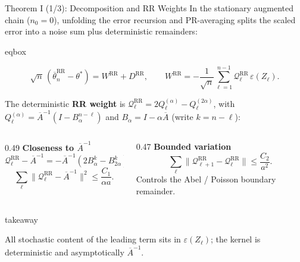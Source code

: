 \documentclass[11pt,aspectratio=169,xcolor=table]{beamer}
\newcommand{\colhead}[1]{\textcolor{ThesisBlue}{\bfseries #1}}
\newcommand{\RR}{\mathrm{RR}}
\newcommand{\Abar}{\overline{A}}
\newcommand{\eps}{\varepsilon}
\newenvironment{eqbox}
  {\begin{beamercolorbox}[wd=\linewidth,sep=0.48em,center,rounded=true]{eqbox}%
   \begin{minipage}{0.97\linewidth}\centering}
  {\end{minipage}\end{beamercolorbox}}
\newenvironment{takeawaybox}
  {\begin{beamercolorbox}[wd=\linewidth,sep=0.52em,leftskip=0.25em,rightskip=0.25em,rounded=true]{takeaway}%
   \begin{minipage}{0.96\linewidth}%
   \llap{{\color{ThesisGreen}\rule{2.5pt}{2.6ex}}\hspace{0.5em}}}
  {\end{minipage}\end{beamercolorbox}}
\begin{document}
\begin{frame}[shrink=10]{Theorem I (1/3): Decomposition and RR Weights}
\footnotesize
In the stationary augmented chain ($n_0=0$), unfolding the error recursion and
PR-averaging splits the scaled error into a noise sum plus deterministic
remainders:

\begin{eqbox}
\[
  \sqrt n\,(\overline\theta_n^\RR-\theta^*)=W^\RR+D^\RR,
  \qquad
  W^\RR=-\frac1{\sqrt n}\sum_{\ell=1}^{n-1}
    \mathcal Q_\ell^\RR\,\eps(Z_\ell).
\]
\end{eqbox}

The deterministic \textbf{RR weight} is
$\mathcal Q_\ell^\RR=2Q_\ell^{(\alpha)}-Q_\ell^{(2\alpha)}$, with
$Q_\ell^{(\alpha)}=\Abar^{-1}(I-B_\alpha^{n-\ell})$ and
$B_\alpha=I-\alpha\Abar$ (write $k=n-\ell$):

\vspace{0.25em}
\begin{columns}[T,onlytextwidth]
  \begin{column}{0.49\textwidth}
    \colhead{Closeness to $\Abar^{-1}$}
    \[
      \mathcal Q_\ell^\RR-\Abar^{-1}
      =-\Abar^{-1}(2B_\alpha^k-B_{2\alpha}^k),
    \]
    \[
      \sum_\ell\lVert\mathcal Q_\ell^\RR-\Abar^{-1}\rVert^2
      \leq\frac{C_1}{\alpha a}.
    \]
  \end{column}
  \begin{column}{0.47\textwidth}
    \colhead{Bounded variation}
    \[
      \sum_\ell\lVert
        \mathcal Q_{\ell+1}^\RR-\mathcal Q_\ell^\RR
      \rVert\leq\frac{C_2}{a^2}.
    \]
    Controls the Abel / Poisson boundary remainder.
  \end{column}
\end{columns}

\vspace{0.2em}
\begin{takeawaybox}
All stochastic content of the leading term sits in $\eps(Z_\ell)$; the kernel
is deterministic and asymptotically $\Abar^{-1}$.
\end{takeawaybox}
\end{frame}
\end{document}
